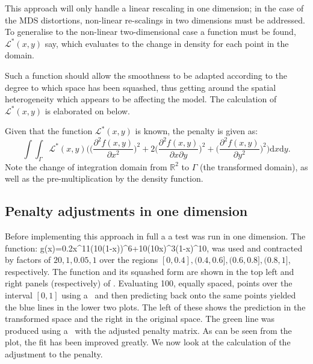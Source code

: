 {This approach will only handle a linear rescaling in one dimension; in the case of the MDS distortions, non-linear re-scalings in two dimensions must be addressed. To generalise  to the non-linear two-dimensional case a function must be found, $\mathcal{L}^*(x,y)$ say, which evaluates to the change in density for each point in the domain. 

Such a function should allow the smoothness to be adapted according to the degree to which space has been squashed, thus getting around the spatial heterogeneity which appears to be affecting the model. The calculation of $\mathcal{L}^*(x,y)$ is elaborated on below.

Given that the function $\mathcal{L}^*(x,y)$ is known, the penalty is given as:
\begin{equation}
\int\int_\Gamma \mathcal{L}^*(x,y) \Big( \Big(\frac{\partial^2 f(x,y)}{\partial x^2}\Big)^2 + 2\Big(\frac{\partial^2 f(x,y)}{\partial x \partial y}\Big)^2 + \Big(\frac{\partial^2 f(x,y)}{\partial y^2}\Big)^2\Big) \text{d}x\text{d}y.
\label{kdeadjust}
\end{equation}
Note the change of integration domain from $\mathbb{R}^2$ to $\Gamma$ (the transformed domain), as well as the pre-multiplication by the density function.

\subsection{Penalty adjustments in one dimension}

Before implementing this approach in full a a test was run in one dimension. The function:
\be
g(x)=0.2x^{11}(10(1-x))^6+10(10x)^3(1-x)^{10},
\label{hardfcn}
\ee
was used and contracted by factors of $20,1,0.05,1$ over the regions $[0,0.4], (0.4,0.6],(0.6,0.8],(0.8,1]$, respectively. The function and its squashed form are shown in the top left and right panels (respectively) of . Evaluating 100, equally spaced, points over the interval $[0,1]$ using a \tprs\ and then predicting back onto the same points yielded the blue lines in the lower two plots. The left of these shows the prediction in the transformed space and the right in the original space. The green line was produced using a \tprs\ with the adjusted penalty matrix. As can be seen from the plot, the fit has been improved greatly. We now look at the calculation of the adjustment to the penalty.

}
